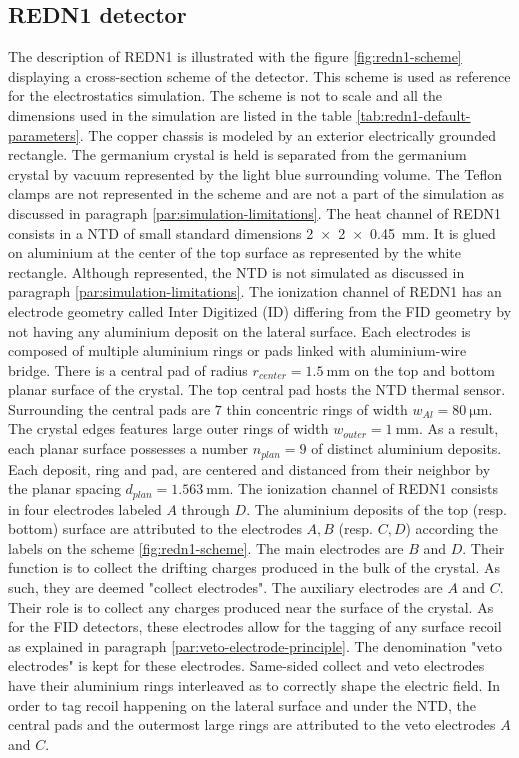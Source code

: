 \subsection{REDN1 detector}
\label{par:redn1-presentation}

The description of REDN1 is illustrated with the figure \ref{fig:redn1-scheme} displaying a cross-section scheme of the detector. This scheme is used as reference for the electrostatics simulation. The scheme is not to scale and all the dimensions used in the simulation are listed in the table \ref{tab:redn1-default-parameters}.
The copper chassis is modeled by an exterior electrically grounded rectangle. The germanium crystal is held is separated from the germanium crystal by vacuum represented by the light blue surrounding volume.
The Teflon clamps are not represented in the scheme and are not a part of the simulation as discussed in paragraph \ref{par:simulation-limitations}.
The heat channel of REDN1 consists in a NTD of small standard dimensions \SI{2 x 2 x 0.45}{\mm}. It is glued on aluminium at the center of the top surface as represented by the white rectangle. Although represented, the NTD is not simulated as discussed in paragraph \ref{par:simulation-limitations}.
The ionization channel of REDN1 has an electrode geometry called Inter Digitized (ID) differing from the FID geometry by not having any aluminium deposit on the lateral surface. Each electrodes is composed of multiple aluminium rings or pads linked with aluminium-wire bridge. There is a central pad of radius $r_{center}=\SI{1.5}{\mm}$ on the top and bottom planar surface of the crystal. The top central pad hosts the NTD thermal sensor. Surrounding the central pads are $7$ thin concentric rings of width $w_{Al} = \SI{80}{\micro\meter}$. The crystal edges features large outer rings of width $w_{outer}=\SI{1}{\mm}$. As a result, each planar surface possesses a number $n_{plan}=9$ of distinct aluminium deposits. Each deposit, ring and pad, are centered and distanced from their neighbor by the planar spacing $d_{plan} = \SI{1.563}{\mm}$.
The ionization channel of REDN1 consists in four electrodes labeled $A$ through $D$. The aluminium deposits of the top (resp. bottom) surface are attributed to the electrodes $A,B$ (resp. $C,D$) according the labels on the scheme \ref{fig:redn1-scheme}.
The main electrodes are $B$ and $D$. Their function is to collect the drifting charges produced in the bulk of the crystal. As such, they are deemed "collect electrodes".
The auxiliary electrodes are $A$ and $C$. Their role is to collect any charges produced near the surface of the crystal. As for the FID detectors, these electrodes allow for the tagging of any surface recoil as explained in paragraph \ref{par:veto-electrode-principle}. The denomination "veto electrodes" is kept for these electrodes.
Same-sided collect and veto electrodes have their aluminium rings interleaved as to correctly shape the electric field. In order to tag recoil happening on the lateral surface and under the NTD, the central pads and the outermost large rings are attributed to the veto electrodes $A$ and $C$. 

